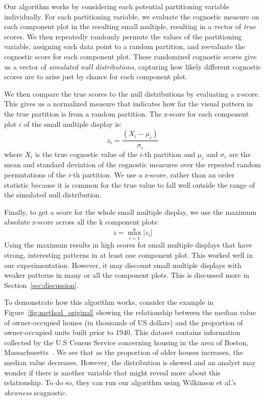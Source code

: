 Our algorithm works by considering each potential partitioning variable individually. For each partitioning variable, we evaluate the cognostic measure on each component plot in the resulting small multiple, resulting in a vector of \emph{true} scores. We then repeatedly randomly permute the values of the partitioning variable, assigning each data point to a random partition, and reevaluate the cognostic score for each component plot. These randomized cognostic scores give us a vector of \emph{simulated null distributions}, capturing how likely different cognostic scores are to arise just by chance for each component plot.

We then compare the true scores to the null distributions by evaluating a z-score. This gives us a normalized measure that indicates how far the visual pattern in the true partition is from a random partition. The z-score for each component plot $i$ of the small multiple display is:
$$z_i = \frac{(X_i-\mu_i)}{\sigma_i}$$ 
where $X_i$ is the true cognostic value of the $i$-th partition and $\mu_i$ and $\sigma_i$ are the mean and standard deviation of the cognostic measures over the repeated random permutations of the $i$-th partition. We use a z-score, rather than an order statistic because it is common for the true value to fall well outside the range of the simulated null distribution.

Finally, to get a score for the whole small multiple display, we use the maximum absolute z-score across all the k component plots: 
$$z = \max_{i=1}^k |z_i|$$
Using the maximum results in high scores for small multiple displays that have strong, interesting patterns in at least one component plot. This worked well in our experimentation. However, it may discount small multiple displays with weaker patterns in many or all the component plots. This is discussed more in Section~\ref{sec:discussion}. 

To demonstrate how this algorithm works, consider the example in Figure~\ref{fig:method_original} showing the relationship between the median value of owner-occupied homes (in thousands of US dollars) and the proportion of owner-occupied units built prior to 1940. This dataset contains information collected by the U.S Census Service concerning housing in the area of Boston, Massachusetts~\cite{Harrison1978}. We see that as the proportion of older houses increases, the median value decreases. However, the distribution is skewed and an analyst may wonder if there is another variable that might reveal more about this relationship.
To do so, they can run our algorithm using Wilkinson et al.'s \emph{skewness} scagnostic.

